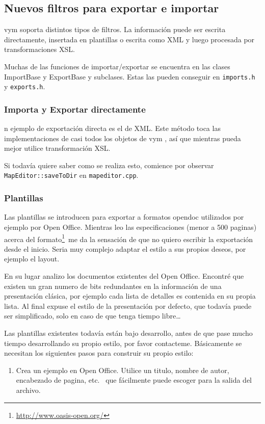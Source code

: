 \documentclass{article}
\newcommand{\vym}{{\sc vym }}
\begin{document}
\begin{appendix}
\subsection{Nuevos filtros para exportar e importar}
\vym soporta distintos tipos de filtros. La informaci\'on puede ser escrita directamente, insertada en plantillas o escrita como XML y luego procesada por transformaciones XSL.

Muchas de las funciones de importar/exportar se encuentra en las clases ImportBase y ExportBase y subclases. Estas las pueden conseguir en {\tt imports.h} y {\tt exports.h}.

\subsubsection*{Importa y Exportar directamente}
n ejemplo de exportaci\'on directa es el de XML. Este m\'etodo toca las implementaciones de casi todos los objetos de \vym, as\'i que mientras pueda mejor utilice transformaci\'on XSL.

Si todav\'ia quiere saber como se realiza esto, comience por observar
{\tt MapEditor::saveToDir} en {\tt mapeditor.cpp}.

\subsubsection*{Plantillas}
Las plantillas se introducen para exportar a formatos opendoc utilizados por ejemplo por Open Office. Mientras leo las especificaciones (menor a 500 paginas) acerca del formato\footnote{
\href{http://www.oasis-open.org/}{http://www.oasis-open.org/}}\ 
me da la sensaci\'on de que no quiero escribir la exportaci\'on desde el inicio. Seria muy complejo adaptar el estilo a sus propios deseos, por ejemplo el layout.

En su lugar analizo los documentos existentes del Open Office. Encontr\'e que existen un gran numero de bits redundantes en la informaci\'on de una presentaci\'on cl\'asica, por ejemplo cada lista de detalles es contenida en su propia lista. Al final expuse el estilo de la presentaci\'on por defecto, que todav\'ia puede ser simplificado, solo en caso de que tenga tiempo libre\ldots

Las plantillas existentes todav\'ia est\'an bajo desarrollo, antes de que pase mucho tiempo desarrollando su propio estilo, por favor contacteme. B\'asicamente se necesitan los siguientes pasos para construir su propio estilo:
\begin{enumerate}
    \item Crea un ejemplo en Open Office. Utilice un titulo, nombre de autor, encabezado de pagina, etc. \ que f\'acilmente puede escoger para la salida del archivo.
    

\end{enumerate}
\end{appendix}
\end{document}
